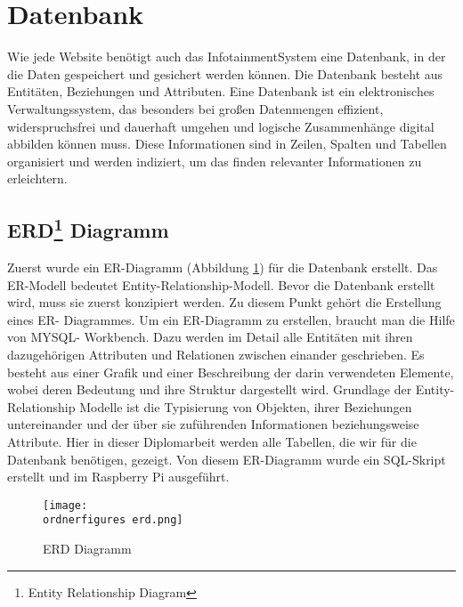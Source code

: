 \section{Datenbank}
Wie jede Website benötigt auch das InfotainmentSystem eine Datenbank, in der die Daten gespeichert und gesichert werden können. Die Datenbank besteht aus Entitäten, Beziehungen und Attributen. Eine Datenbank ist ein elektronisches Verwaltungssystem, das besonders bei großen Datenmengen effizient, widerspruchsfrei und dauerhaft umgehen und logische Zusammenhänge digital abbilden können muss. Diese Informationen sind in Zeilen, Spalten und Tabellen organisiert und werden indiziert, um das finden relevanter Informationen zu erleichtern.

\subsection{ERD\footnote{Entity Relationship Diagram} Diagramm}
Zuerst wurde ein ER-Diagramm (Abbildung \ref{fi:erd}) für die Datenbank erstellt. Das ER-Modell bedeutet Entity-Relationship-Modell. Bevor die Datenbank erstellt wird, muss sie zuerst konzipiert werden. Zu diesem Punkt gehört die Erstellung eines ER- Diagrammes. Um ein ER-Diagramm zu erstellen, braucht man die Hilfe von MYSQL- Workbench. Dazu werden im Detail alle Entitäten mit ihren dazugehörigen Attributen und Relationen zwischen einander geschrieben. Es besteht aus einer Grafik und einer Beschreibung der darin verwendeten Elemente, wobei deren Bedeutung und ihre Struktur dargestellt wird. Grundlage der Entity-Relationship Modelle ist die Typisierung von Objekten, ihrer Beziehungen untereinander und der über sie zuführenden Informationen beziehungsweise Attribute. Hier in dieser Diplomarbeit werden alle Tabellen, die wir für die Datenbank benötigen, gezeigt. Von diesem ER-Diagramm wurde ein SQL-Skript erstellt und im Raspberry Pi ausgeführt.

\begin{figure}[H]
	\centering
	\texttt{[image: \\ordnerfigures erd.png]}
	\caption{ERD Diagramm}
	\label{fi:erd}
\end{figure}

